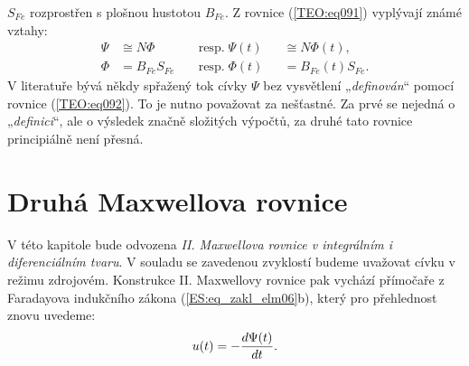       \(S_{Fe}\) rozprostřen s plošnou hustotou \(B_{Fe}\). Z rovnice (\ref{TEO:eq091}) vyplývají
      známé vztahy:
      \begin{subequations}\label{TEO:eq092} 
        \begin{alignat}{3}
          \Psi & \cong  N\Phi   && \;\text{resp.}\; \Psi(t)&& \cong  N\Phi(t),  \label{TEO:eq092a}\\ 
          \Phi & =  B_{Fe}S_{Fe}&& \;\text{resp.}\; \Phi(t)&& = B_{Fe}(t)S_{Fe}.\label{TEO:eq092b}  
        \end{alignat}
      \end{subequations}
      V literatuře bývá někdy spřažený tok cívky \(\Psi\) bez vysvětlení „\emph{definován}“ pomocí
      rovnice (\ref{TEO:eq092}). To je nutno považovat za nešťastné. Za prvé se nejedná o
      „\emph{definici}“, ale o výsledek značně složitých výpočtů, za druhé tato rovnice principiálně
      není přesná.

    \section{Druhá Maxwellova rovnice}\label{ES:sec04}
    
      V této kapitole bude odvozena \emph{II. Maxwellova rovnice v integrálním i diferenciálním 
      tvaru}. V souladu se zavedenou zvyklostí budeme uvažovat cívku v režimu zdrojovém. Konstrukce 
      II. Maxwellovy rovnice pak vychází přímočaře z Faradayova indukčního zákona 
      (\ref{ES:eq_zakl_elm06}b), který pro přehlednost znovu uvedeme:
      \begin{equation}\label{ES:eq_zakl_elm24}
      u(t) = -\dfrac{d \Psi(t)}{d t}.
      \end{equation}
      
